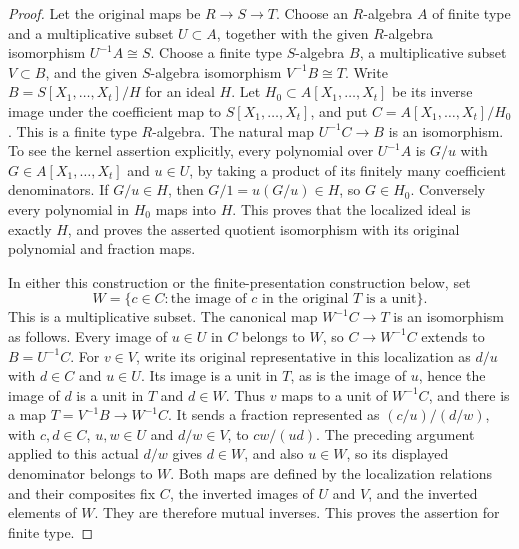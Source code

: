 \begin{proof}
Let the original maps be $R\to S\to T$. Choose an $R$-algebra
$A$ of finite type and a multiplicative subset $U\subset A$,
together with the given $R$-algebra isomorphism $U^{-1}A\cong S$.
Choose a finite type $S$-algebra $B$, a multiplicative subset
$V\subset B$, and the given $S$-algebra isomorphism
$V^{-1}B\cong T$.
Write $B=S[X_1,\ldots,X_t]/H$ for an ideal $H$.
Let $H_0\subset A[X_1,\ldots,X_t]$ be its inverse image under
the coefficient map to $S[X_1,\ldots,X_t]$, and put
$C=A[X_1,\ldots,X_t]/H_0$. This is a finite type $R$-algebra.
The natural map $U^{-1}C\to B$ is an isomorphism.
To see the kernel assertion explicitly, every polynomial over
$U^{-1}A$ is $G/u$ with $G\in A[X_1,\ldots,X_t]$ and
$u\in U$, by taking a product of its finitely many coefficient
denominators. If $G/u\in H$, then $G/1=u(G/u)\in H$,
so $G\in H_0$. Conversely every polynomial in $H_0$ maps
into $H$. This proves that the localized ideal is exactly
$H$, and proves the asserted quotient isomorphism with its
original polynomial and fraction maps.

In either this construction or the finite-presentation construction
below, set
$$
W=\{c\in C:\text{the image of }c\text{ in the original }T
\text{ is a unit}\}.
$$
This is a multiplicative subset. The canonical map
$W^{-1}C\to T$ is an isomorphism as follows.
Every image of $u\in U$ in $C$ belongs to $W$, so
$C\to W^{-1}C$ extends to $B=U^{-1}C$.
For $v\in V$, write its original representative in this
localization as $d/u$ with $d\in C$ and $u\in U$.
Its image is a unit in $T$, as is the image of $u$, hence
the image of $d$ is a unit in $T$ and $d\in W$.
Thus $v$ maps to a unit of $W^{-1}C$, and there is a map
$T=V^{-1}B\to W^{-1}C$.
It sends a fraction represented as $(c/u)/(d/w)$, with
$c,d\in C$, $u,w\in U$ and $d/w\in V$, to
$cw/(ud)$. The preceding argument applied to this actual
$d/w$ gives $d\in W$, and also $u\in W$, so its
displayed denominator belongs to $W$.
Both maps are defined by the localization relations and their
composites fix $C$, the inverted images of $U$ and $V$,
and the inverted elements of $W$. They are therefore mutual
inverses. This proves the assertion for finite type.


\end{proof}
